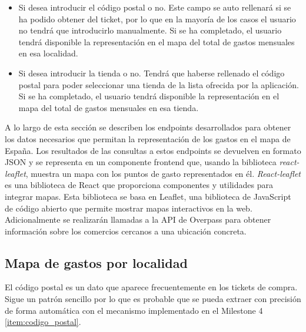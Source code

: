 \begin{itemize}
    \item Si desea introducir el código postal o no. Este campo se auto rellenará si se ha podido obtener del ticket, por lo que en la mayoría de los casos el usuario no tendrá que introducirlo manualmente. Si se ha completado, el usuario tendrá disponible la representación en el mapa del total de gastos mensuales en esa localidad. 
    
    \item Si desea introducir la tienda o no. Tendrá que haberse rellenado el código postal para poder seleccionar una tienda de la lista ofrecida por la aplicación. Si se ha completado, el usuario tendrá disponible la representación en el mapa del total de gastos mensuales en esa tienda.
\end{itemize}

A lo largo de esta sección se describen los endpoints desarrollados para obtener los datos necesarios que permitan la representación de los gastos en el mapa de España. Los resultados de las consultas a estos endpoints se devuelven en formato JSON y se representa en un componente frontend que, usando la biblioteca \textit{react-leaflet}, muestra un mapa con los puntos de gasto representados en él. \textit{React-leaflet} es una biblioteca de React que proporciona componentes y utilidades para integrar mapas. Esta biblioteca se basa en Leaflet, una biblioteca de JavaScript de código abierto que permite mostrar mapas interactivos en la web. Adicionalmente se realizarán llamadas a la API de Overpass para obtener información sobre los comercios cercanos a una ubicación concreta.


\subsection{Mapa de gastos por localidad}
El código postal es un dato que aparece frecuentemente en los tickets de compra. Sigue un patrón sencillo por lo que es probable que se pueda extraer con precisión de forma automática con el mecanismo implementado en el Milestone 4 \ref{item:codigo_postal}. 



